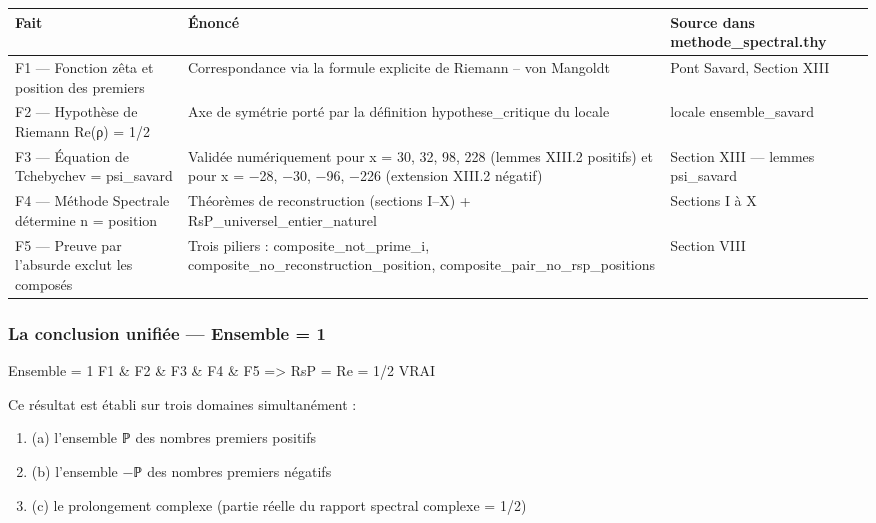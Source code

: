 \documentclass[11pt,a4paper]{article}
\begin{document}
\begin{longtable}{|p{}|p{}|p{}|}
\hline
Fait & Énoncé & Source dans methode\_spectral.thy \\
\hline
F1 — Fonction zêta et position des premiers & Correspondance via la formule explicite de Riemann – von Mangoldt & Pont Savard, Section XIII \\
\hline
F2 — Hypothèse de Riemann Re(ρ) = 1/2 & Axe de symétrie porté par la définition hypothese\_critique du locale & locale ensemble\_savard \\
\hline
F3 — Équation de Tchebychev = psi\_savard & Validée numériquement pour x = 30, 32, 98, 228 (lemmes XIII.2 positifs) et pour x = −28, −30, −96, −226 (extension XIII.2 négatif) & Section XIII — lemmes psi\_savard \\
\hline
F4 — Méthode Spectrale détermine n = position & Théorèmes de reconstruction (sections I–X) + RsP\_universel\_entier\_naturel & Sections I à X \\
\hline
F5 — Preuve par l'absurde exclut les composés & Trois piliers : composite\_not\_prime\_i, composite\_no\_reconstruction\_position, composite\_pair\_no\_rsp\_positions & Section VIII \\
\hline
\end{longtable}


\subsubsection{La conclusion unifiée — Ensemble = 1}

\begin{holcode}[title={Synthèse logique unifiée}]
Ensemble = 1
{ F1 & F2 & F3 & F4 & F5 }
=> RsP = Re = 1/2 VRAI
\end{holcode}


Ce résultat est établi sur trois domaines simultanément :

\begin{enumerate}[leftmargin=*]
\item (a) l'ensemble ℙ des nombres premiers positifs
\item (b) l'ensemble −ℙ des nombres premiers négatifs
\item (c) le prolongement complexe (partie réelle du rapport spectral complexe = 1/2)
\end{enumerate}
\end{document}
